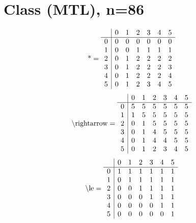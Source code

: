 \documentclass[11pt]{article}
\begin{document}
\section{Class (MTL), n=86}
\[\text{*} = 
\begin{array}{r | r r r r r r}
 & 0 & 1 & 2 & 3 & 4 & 5 \\ \hline
0 & 0 & 0 & 0 & 0 & 0 & 0 \\
1 & 0 & 0 & 1 & 1 & 1 & 1 \\
2 & 0 & 1 & 2 & 2 & 2 & 2 \\
3 & 0 & 1 & 2 & 2 & 2 & 3 \\
4 & 0 & 1 & 2 & 2 & 2 & 4 \\
5 & 0 & 1 & 2 & 3 & 4 & 5 \\
\end{array}
\]
\[\text{\textbackslash rightarrow} = 
\begin{array}{r | r r r r r r}
 & 0 & 1 & 2 & 3 & 4 & 5 \\ \hline
0 & 5 & 5 & 5 & 5 & 5 & 5 \\
1 & 1 & 5 & 5 & 5 & 5 & 5 \\
2 & 0 & 1 & 5 & 5 & 5 & 5 \\
3 & 0 & 1 & 4 & 5 & 5 & 5 \\
4 & 0 & 1 & 4 & 4 & 5 & 5 \\
5 & 0 & 1 & 2 & 3 & 4 & 5 \\
\end{array}
\]
\[\text{\textbackslash le} = 
\begin{array}{r | r r r r r r}
 & 0 & 1 & 2 & 3 & 4 & 5 \\ \hline
0 & 1 & 1 & 1 & 1 & 1 & 1 \\
1 & 0 & 1 & 1 & 1 & 1 & 1 \\
2 & 0 & 0 & 1 & 1 & 1 & 1 \\
3 & 0 & 0 & 0 & 1 & 1 & 1 \\
4 & 0 & 0 & 0 & 0 & 1 & 1 \\
5 & 0 & 0 & 0 & 0 & 0 & 1 \\
\end{array}
\]
\end{document}
